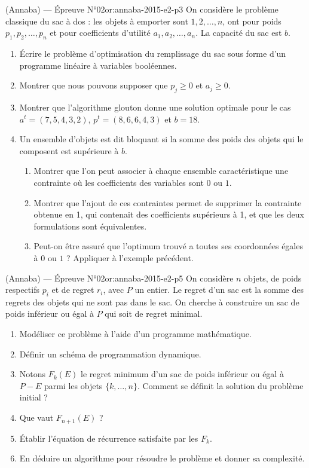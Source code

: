 \begin{problem}{(Annaba) — Épreuve N°02}{or:annaba-2015-e2-p3}
On considère le problème classique du sac à dos : les objets à emporter sont $1,2,\ldots,n$, ont pour poids $p_1,p_2,\ldots,p_n$ et pour coefficients d'utilité $a_1,a_2,\ldots,a_n$. La capacité du sac est $b$.
\begin{enumerate}\item Écrire le problème d'optimisation du remplissage du sac sous forme d'un programme linéaire à variables booléennes.\item Montrer que nous pouvons supposer que $p_j\ge0$ et $a_j\ge0$.\item Montrer que l'algorithme glouton donne une solution optimale pour le cas $a^t=(7,5,4,3,2)$, $p^t=(8,6,6,4,3)$ et $b=18$.\item Un ensemble d'objets est dit bloquant si la somme des poids des objets qui le composent est supérieure à $b$.
\begin{enumerate}\item Montrer que l'on peut associer à chaque ensemble caractéristique une contrainte où les coefficients des variables sont $0$ ou $1$.\item Montrer que l'ajout de ces contraintes permet de supprimer la contrainte obtenue en 1, qui contenait des coefficients supérieurs à 1, et que les deux formulations sont équivalentes.\item Peut-on être assuré que l'optimum trouvé a toutes ses coordonnées égales à $0$ ou $1$ ? Appliquer à l'exemple précédent.\end{enumerate}\end{enumerate}
\end{problem}
\newpage
\begin{problem}{(Annaba) — Épreuve N°02}{or:annaba-2015-e2-p5}
On considère $n$ objets, de poids respectifs $p_i$ et de regret $r_i$, avec $P$ un entier. Le regret d'un sac est la somme des regrets des objets qui ne sont pas dans le sac. On cherche à construire un sac de poids inférieur ou égal à $P$ qui soit de regret minimal.
\begin{enumerate}\item Modéliser ce problème à l'aide d'un programme mathématique.\item Définir un schéma de programmation dynamique.\item Notons $F_k(E)$ le regret minimum d'un sac de poids inférieur ou égal à $P-E$ parmi les objets $\{k,\ldots,n\}$. Comment se définit la solution du problème initial ?\item Que vaut $F_{n+1}(E)$ ?\item Établir l'équation de récurrence satisfaite par les $F_k$.\item En déduire un algorithme pour résoudre le problème et donner sa complexité.\end{enumerate}
\end{problem}
